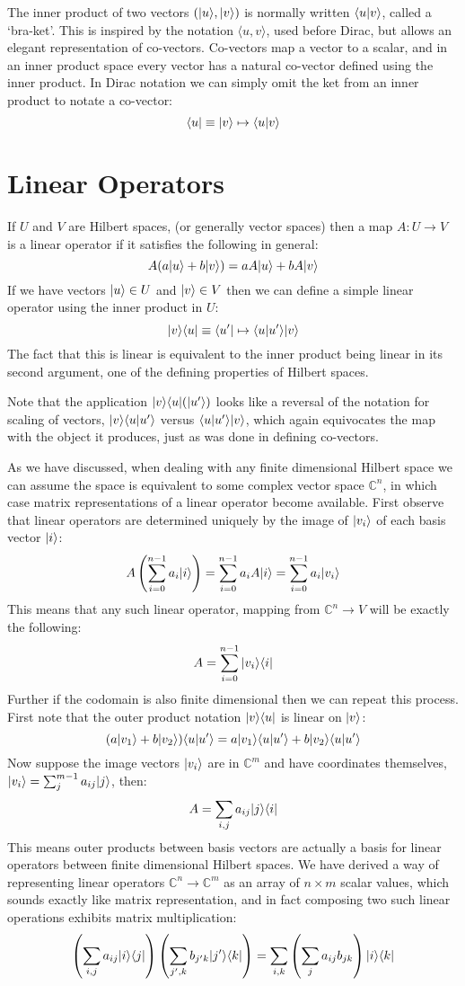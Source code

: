 The inner product of two vectors $(| u \rangle, | v \rangle)$ is normally written $\langle u | v \rangle$, called a `bra-ket'. This is inspired by the notation $\langle u, v\rangle$, used before Dirac, but allows an elegant representation of co-vectors. Co-vectors map a vector to a scalar, and in an inner product space every vector has a natural co-vector defined using the inner product. In Dirac notation we can simply omit the ket from an inner product to notate a co-vector:
\[\langle u | \equiv | v \rangle \mapsto \langle u | v \rangle\]

\section{Linear Operators}
If $U$ and $V$ are Hilbert spaces, (or generally vector spaces) then a map $A: U \to V$ is a linear operator if it satisfies the following in general:
\[A(a| u \rangle + b| v \rangle) = aA| u \rangle + bA| v \rangle\]
If we have vectors $| u \rangle \in U$ and $| v \rangle \in V$ then we can define a simple linear operator using the inner product in $U$:
\[| v \rangle\langle u | \equiv \langle u' | \mapsto \langle u | u' \rangle| v \rangle\]
The fact that this is linear is equivalent to the inner product being linear in its second argument, one of the defining properties of Hilbert spaces.

Note that the application $| v \rangle\langle u |(| u' \rangle)$ looks like a reversal of the notation for scaling of vectors, $| v \rangle\langle u | u' \rangle$ versus $\langle u | u' \rangle| v \rangle$, which again equivocates the map with the object it produces, just as was done in defining co-vectors.

As we have discussed, when dealing with any finite dimensional Hilbert space we can assume the space is equivalent to some complex vector space $\mathbb{C}^n$, in which case matrix representations of a linear operator become available. First observe that linear operators are determined uniquely by the image of $| v_i \rangle$ of each basis vector $| i \rangle$:
\[A\left(\sum_{i=0}^{n-1}a_i| i \rangle\right) = \sum_{i=0}^{n-1}a_iA| i \rangle = \sum_{i=0}^{n-1}a_i| v_i \rangle\]
This means that any such linear operator, mapping from $\mathbb{C}^n \to V$ will be exactly the following:
\[A = \sum_{i=0}^{n-1} | v_i \rangle\langle i |\]
Further if the codomain is also finite dimensional then we can repeat this process. First note that the outer product notation $| v \rangle\langle u |$ is linear on $| v \rangle$:
\[(a| v_1 \rangle+b| v_2 \rangle)\langle u | u' \rangle = a| v_1 \rangle\langle u | u' \rangle+b| v_2 \rangle\langle u | u' \rangle\]
Now suppose the image vectors $| v_i \rangle$ are in $\mathbb{C}^m$ and have coordinates themselves, $| v_i \rangle = \sum_j^{m-1} a_{ij}| j \rangle$, then:
\begin{align*}
A = \sum_{i,j} a_{ij}| j \rangle\langle i |
\end{align*}
This means outer products between basis vectors are actually a basis for linear operators between finite dimensional Hilbert spaces. We have derived a way of representing linear operators $\mathbb{C}^n \to \mathbb{C}^m$ as an array of $n \times m$ scalar values, which sounds exactly like matrix representation, and in fact composing two such linear operations exhibits matrix multiplication:
\[\left(\sum_{i,j}a_{ij}| i \rangle\langle j |\right)\left(\sum_{j',k}b_{j'k}| j' \rangle\langle k |\right) = \sum_{i,k}\left(\sum_j a_{ij}b_{jk}\right)| i \rangle\langle k |\]

